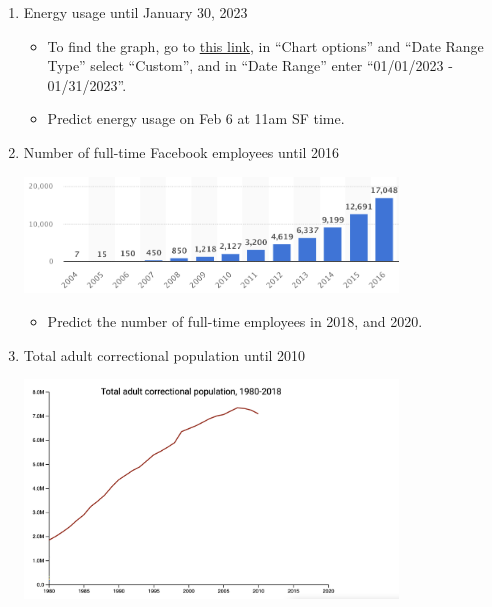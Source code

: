 \documentclass[11pt]{article}
\begin{document}
\begin{enumerate}
	\item Energy usage until January 30, 2023
	
	
	\begin{itemize}
		\item To find the graph, go to \href{https://www.eia.gov/electricity/gridmonitor/expanded-view/electric_overview/US48/US48/ElectricityOverview-2/edit}{this link}, in ``Chart options'' and ``Date Range Type'' select ``Custom'', and in ``Date Range'' enter ``01/01/2023 - 01/31/2023''.
		\item Predict energy usage on Feb 6 at 11am SF time.
	\end{itemize}
	
	\item Number of full-time Facebook employees until 2016
	
	\begin{center}	
		\includegraphics[width = 375px]{2.png}
	\end{center}

	\begin{itemize}
		\item Predict the number of full-time employees in 2018, and 2020.
	\end{itemize}
	
	\item Total adult correctional population until 2010

	\begin{center}	
		\includegraphics[width = 375px]{3.png}
	\end{center}



\end{enumerate}
\end{document}
